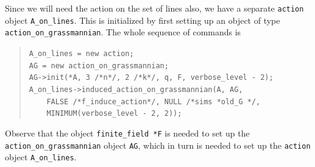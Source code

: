 Since we will need the action on the set of lines also, we have 
a separate \verb'action' object \verb'A_on_lines'. This is initialized 
by first setting up an object of type 
\verb'action_on_grassmannian'. The whole sequence of commands is
\begin{quote}
\verb'A_on_lines = new action;'\\
\verb'AG = new action_on_grassmannian;'\\
\verb'AG->init(*A, 3 /*n*/, 2 /*k*/, q, F, verbose_level - 2);'\\
\verb'A_on_lines->induced_action_on_grassmannian(A, AG,'\\
\verb'    FALSE /*f_induce_action*/, NULL /*sims *old_G */, '\\
\verb'    MINIMUM(verbose_level - 2, 2));'\\
\end{quote}
Observe that the object \verb'finite_field *F' is needed to set up the 
\verb'action_on_grassmannian' object \verb'AG', which in turn is needed to set up 
the \verb'action' object \verb'A_on_lines'.

\bigskip







